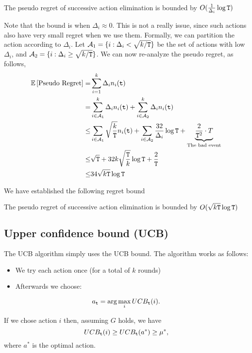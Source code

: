 \begin{theorem}
\label{thm:MAB:SE1}
The pseudo regret of successive action elimination is bounded by $O(\frac{1}{\Delta_{i}}\log {\tt T})$
\end{theorem}

Note that the bound is  when $\Delta_i\approx 0$. This is not a really issue, since such actions also have very small regret when we use them. Formally, we can partition the action according to $\Delta_i$. Let $\mathcal{A}_1=\{i:\Delta_i< \sqrt{k/{\tt T}}\}$ be the set of actions with low $\Delta_i$, and $\mathcal{A}_2=\{i:\Delta_i\geq \sqrt{k/{\tt T}}\}$. We can now re-analyze the pseudo regret, as follows,
\begin{align*}
\mathbb{E}\left[\text{Pseudo Regret}\right]  = &  \sum_{i=1}^{k}\Delta_{i}n_{i}({\tt t})\\
= &  \sum_{i\in \mathcal{A}_1}^{k}\Delta_{i}n_{i}({\tt t})+ \sum_{i\in \mathcal{A}_2}^{k}\Delta_{i}n_{i}({\tt t})\\
  \le & \sum_{i\in\mathcal{A}_1}\sqrt{\frac{k}{{\tt T}}}n_{i}({\tt t}) +\sum_{i\in\mathcal{A}_2}\frac{32}{\Delta_{i}}\log {\tt T}
  +\underbrace{\frac{2}{{\tt T}^{2}}\cdot T}_{\text{The bad event}}\\
  \leq & \sqrt{{\tt T}}+ 32 k \sqrt{\frac{{\tt T}}{k}}\log{\tt T}+ \frac{2}{{\tt T}}\\
  \leq & 34  \sqrt{k{\tt T}}\log{\tt T}
\end{align*}

We have established the following regret bound

\begin{theorem}
\label{thm:MAB:SE2}
The pseudo regret of successive action elimination is bounded by $O( \sqrt{k{\tt T}}\log{\tt T})$
\end{theorem}


\subsection{Upper confidence bound (UCB)}

The UCB algorithm simply uses the UCB bound. The algorithm works as
follows:
\begin{itemize}
\item We try each action once (for a total of $k$ rounds)
\item Afterwards we choose:
\end{itemize}
\[
a_{{\tt t}}=\arg\max_{i}UCB_{{\tt t}}(i).
\]

If we chose action $i$ then, assuming $G$ holds, we have
\[
UCB_{{\tt t}}(i)  \ge  UCB_{{\tt t}}(a^*)\geq\mu^{*},
\]
where $a^*$ is the optimal action.

